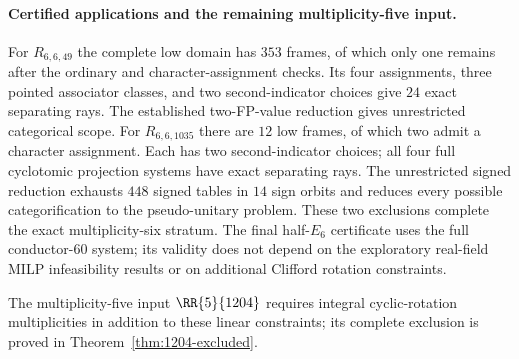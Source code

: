 \paragraph{Certified applications and the remaining multiplicity-five input.}
For $R_{6,6,49}$ the complete low domain has $353$ frames, of which only
one remains after the ordinary and character-assignment checks.  Its four assignments, three pointed
associator classes, and two second-indicator choices give $24$ exact
separating rays.  The established two-FP-value reduction gives unrestricted
categorical scope.
For $R_{6,6,1035}$ there are $12$ low frames, of which two admit a character
assignment.  Each has two second-indicator choices; all four full
cyclotomic projection systems have exact separating rays.  The unrestricted
signed reduction exhausts $448$ signed tables in $14$ sign orbits and
reduces every possible categorification to the pseudo-unitary problem.
These two exclusions complete the exact multiplicity-six stratum.
The final half-$E_6$ certificate uses the full conductor-$60$ system;
its validity does not depend on the exploratory real-field MILP
infeasibility results or on additional Clifford rotation constraints.

The multiplicity-five input $\RR{5}{1204}$ requires integral cyclic-rotation
multiplicities in addition to these linear constraints; its complete
exclusion is proved in Theorem~\ref{thm:1204-excluded}.
